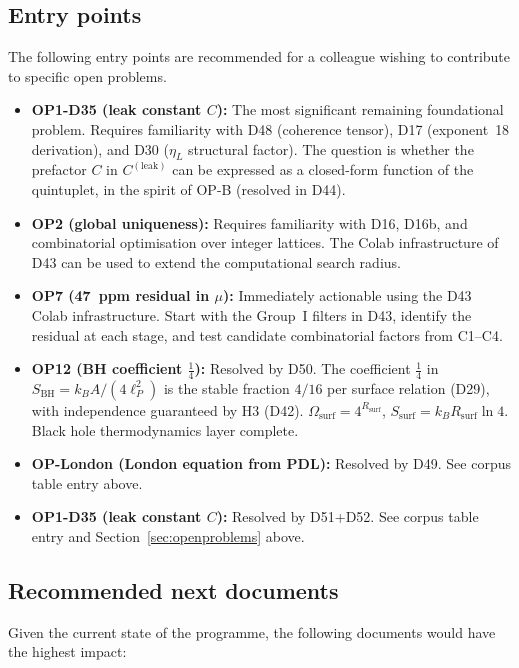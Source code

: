 \documentclass[11pt,a4paper]{article}
\theoremstyle{plain}
\theoremstyle{definition}
\theoremstyle{remark}
\newcommand{\Rsurf}{R_{\mathrm{surf}}}
\newcommand{\SBH}{S_{\mathrm{BH}}}
\begin{document}
\subsection{Entry points}
\label{subsec:entrypoints}
The following entry points are recommended for a colleague wishing to contribute to specific open problems.

\begin{itemize}
\item \textbf{OP1-D35 (leak constant $C$):} The most significant remaining foundational problem. Requires familiarity with D48 (coherence tensor), D17 (exponent~18 derivation), and D30 ($\eta_L$ structural factor). The question is whether the prefactor $C$ in $C^{(\mathrm{leak})}$ can be expressed as a closed-form function of the quintuplet, in the spirit of OP-B (resolved in D44).
\item \textbf{OP2 (global uniqueness):} Requires familiarity with D16, D16b, and combinatorial optimisation over integer lattices. The Colab infrastructure of D43 can be used to extend the computational search radius.
\item \textbf{OP7 (47~ppm residual in $\mu$):} Immediately actionable using the D43 Colab infrastructure. Start with the Group~I filters in D43, identify the residual at each stage, and test candidate combinatorial factors from C1--C4.
\item \textbf{OP12 (BH coefficient $\tfrac{1}{4}$):} \textcolor{proofblue}{Resolved by D50.} The coefficient $\tfrac{1}{4}$ in $\SBH = k_B A/(4\ell_P^2)$ is the stable fraction $4/16$ per surface relation (D29), with independence guaranteed by H3 (D42). $\Omega_{\mathrm{surf}} = 4^{\Rsurf}$, $S_{\mathrm{surf}} = k_B\Rsurf\ln 4$. Black hole thermodynamics layer complete.
\item \textbf{OP-London (London equation from PDL):} \textcolor{proofblue}{Resolved by D49.} See corpus table entry above.
\item \textbf{OP1-D35 (leak constant $C$):} \textcolor{proofblue}{Resolved by D51+D52.} See corpus table entry and Section~\ref{sec:openproblems} above.
\end{itemize}

\subsection{Recommended next documents}
\label{subsec:nextdocs}
Given the current state of the programme, the following documents would have the highest impact:
\end{document}
